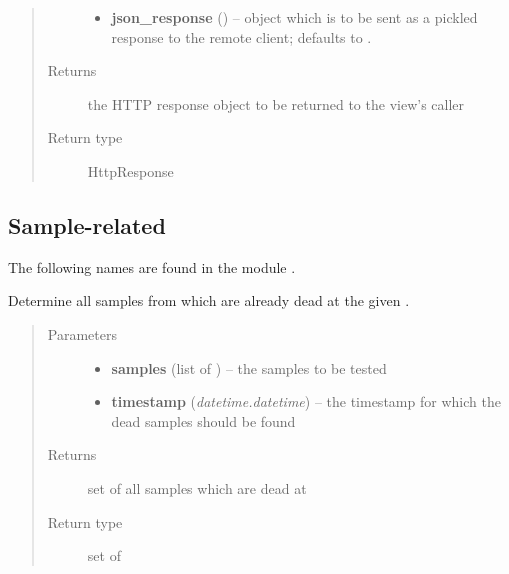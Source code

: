 \documentclass[a4paper,11pt,english]{sphinxmanual}
\begin{document}
\begin{fulllineitems}
\begin{quote}
\begin{description}
\begin{itemize}
\item {} 
\textbf{json\_response} () -- object which is to be sent as a pickled response to
the remote client; defaults to .

\end{itemize}

\item[{Returns}] \leavevmode
the HTTP response object to be returned to the view's caller

\item[{Return type}] \leavevmode
HttpResponse

\end{description}\end{quote}

\end{fulllineitems}



\subsection{Sample-related}
\label{programming/utilities:sample-related}
The following names are found in the module .

\begin{fulllineitems}
\label{programming/utilities:samples.utils.views.dead_samples}
Determine all samples from  which are already dead at the
given .
\begin{quote}\begin{description}
\item[{Parameters}] \leavevmode\begin{itemize}
\item {} 
\textbf{samples} (list of ) -- the samples to be tested

\item {} 
\textbf{timestamp} (\emph{datetime.datetime}) -- the timestamp for which the dead samples should be found

\end{itemize}

\item[{Returns}] \leavevmode
set of all samples which are dead at 

\item[{Return type}] \leavevmode
set of 

\end{description}\end{quote}

\end{fulllineitems}
\end{document}
